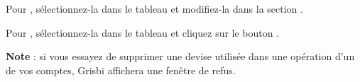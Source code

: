 Pour , sélectionnez-la dans le tableau  et modifiez-la dans la section .

Pour , sélectionnez-la dans le tableau  et cliquez sur le bouton .

\textbf{Note} : si vous essayez de supprimer une devise utilisée dans une opération d'un de vos comptes, Grisbi affichera une fenêtre de refus.


%
%


